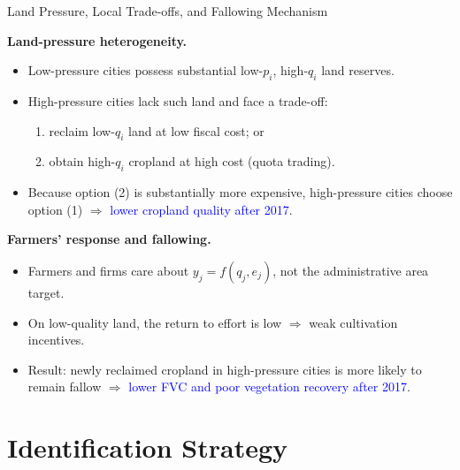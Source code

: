 \documentclass[10pt, xcolor=x11names,compress, aspectratio=169]{beamer}
\begin{document}
\begin{frame}{Land Pressure, Local Trade-offs, and Fallowing Mechanism}

\textbf{Land-pressure heterogeneity.}
\begin{itemize}
  \item Low-pressure cities possess substantial low-$p_i$, high-$q_i$ land reserves.
  \item High-pressure cities lack such land and face a trade-off:
  \begin{enumerate}
     \item reclaim low-$q_i$ land at low fiscal cost; or
     \item obtain high-$q_i$ cropland at high cost 
           (quota trading).
  \end{enumerate}
  \item Because option (2) is substantially more expensive,  
        high-pressure cities choose option (1)  
        $\Rightarrow$ \textcolor{blue}{lower cropland quality after 2017}.
\end{itemize}

\medskip

\textbf{Farmers’ response and fallowing.}
\begin{itemize}
  \item Farmers and firms care about $y_j = f(q_j,e_j)$, not the administrative area target.
  \item On low-quality land, the return to effort is low $\Rightarrow$ weak cultivation incentives.
  \item Result: newly reclaimed cropland in high-pressure cities is more likely to remain fallow  
        $\Rightarrow$ \textcolor{blue}{lower FVC and poor vegetation recovery after 2017}.
\end{itemize}

\end{frame}

\section{Identification Strategy}
\end{document}

